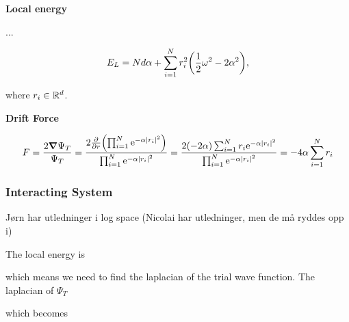\textbf{Local energy}

... 

\begin{equation*}
    E_L = N d \alpha + \sum_{i=1}^N r_i^2 \qty(\frac{1}{2} \omega^2 - 2 \alpha^2),
\end{equation*}

where $r_i \in \mathbb{R}^d$.

\textbf{Drift Force}

\begin{equation*}
    F = \frac{2 \grad \Psi_T}{\Psi_T} = \frac{2 \pdv{r} \qty( \prod_{i=1}^N \mathrm{e}^{-\alpha \abs{r_i}^2})}{\prod_{i=1}^N \mathrm{e}^{-\alpha \abs{r_i}^2}} = \frac{2 (-2 \alpha) \sum_{i=1}^N r_i \mathrm{e}^{-\alpha \abs{r_i}^2}}{\prod_{i=1}^N \mathrm{e}^{-\alpha \abs{r_i}^2}} = - 4 \alpha \sum_{i=1}^N r_i
\end{equation*}

\subsubsection*{Interacting System}

Jørn har utledninger i log space (Nicolai har utledninger, men de må ryddes opp i)


The local energy is 


which means we need to find the laplacian of the trial wave function. 
The laplacian of $\Psi_T$

which becomes 


